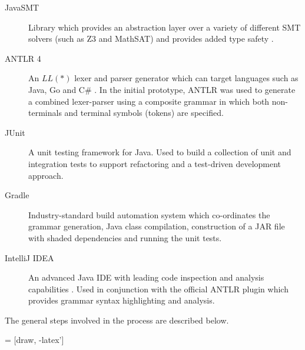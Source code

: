 \documentclass[a4paper]{article}
\begin{document}
    \begin{description}
        \item[JavaSMT] Library which provides an abstraction layer over a variety of different SMT solvers (such as Z3 and MathSAT) and provides added type safety \citep{karpenkov2016javasmt}.
        \item[ANTLR 4] An $LL(*)$ lexer and parser generator which can target languages such as Java, Go and C\# \citep{parr2011ll}. In the initial prototype, ANTLR was used to generate a combined lexer-parser using a composite grammar in which both non-terminals and terminal symbols (tokens) are specified.
        \item[JUnit] A unit testing framework for Java. Used to build a collection of unit and integration tests to support refactoring and a test-driven development approach.
        \item[Gradle] Industry-standard build automation system which co-ordinates the grammar generation, Java class compilation, construction of a JAR file with shaded dependencies and running the unit tests.
        \item[IntelliJ IDEA] An advanced Java IDE with leading code inspection and analysis capabilities \citep{ideainspections} \citep{Jemerov:2008:IRI:1636642.1636655}. Used in conjunction with the official ANTLR plugin which provides grammar syntax highlighting and analysis.
    \end{description}

    The general steps involved in the process are described below.
    
     = [draw, -latex']
    \begin{figure}[H]


    \end{figure}
    
\end{document}
